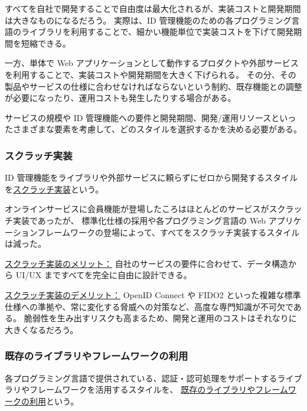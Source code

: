 \documentclass[uplatex]{jsarticle}
\def\label#1{}%
\begin{document}
すべてを自社で開発することで自由度は最大化されるが、実装コストと開発期間は大きなものになるだろう。
実際は、ID 管理機能のための各プログラミング言語のライブラリを利用することで、細かい機能単位で実装コストを下げて開発期間を短縮できる。

一方、単体で Web アプリケーションとして動作するプロダクトや外部サービスを利用することで、実装コストや開発期間を大きく下げられる。
その分、その製品やサービスの仕様に合わせなければならないという制約、既存機能との調整が必要になったり、運用コストも発生したりする場合がある。

サービスの規模や ID 管理機能への要件と開発期間、開発/運用リソースといったさまざまな要素を考慮して、どのスタイルを選択するかを決める必要がある。

\subsubsection{スクラッチ実装}

\begin{dfn}[スクラッチ実装]\label{dfn:ch6-scratch}
ID 管理機能をライブラリや外部サービスに頼らずにゼロから開発するスタイルを\underline{スクラッチ実装}という。
\end{dfn}

オンラインサービスに会員機能が登場したころはほとんどのサービスがスクラッチ実装であったが、
標準化仕様の採用や各プログラミング言語の Web アプリケーションフレームワークの登場によって、すべてをスクラッチ実装するスタイルは減った。

\underline{スクラッチ実装のメリット：}
自社のサービスの要件に合わせて、データ構造から UI/UX まですべてを完全に自由に設計できる。

\underline{スクラッチ実装のデメリット：}
OpenID Connect や FIDO2 といった複雑な標準仕様への準拠や、常に変化する脅威への対策など、高度な専門知識が不可欠である。
脆弱性を生み出すリスクも高まるため、開発と運用のコストはそれなりに大きくなるだろう。

\subsubsection{既存のライブラリやフレームワークの利用}

\begin{dfn}[既存のライブラリやフレームワークの利用]\label{dfn:ch6-library}
各プログラミング言語で提供されている、認証・認可処理をサポートするライブラリやフレームワークを活用するスタイルを、
\underline{既存のライブラリやフレームワークの利用}という。
\end{dfn}
\end{document}
